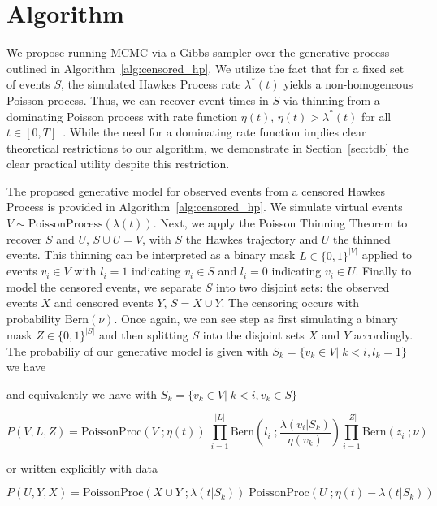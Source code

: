 \documentclass[11pt]{article}
\begin{document}
\section{Algorithm}

We propose running MCMC via a Gibbs sampler over the generative process outlined in Algorithm~\ref{alg:censored_hp}. We utilize the fact that for a fixed set of events $S$, the simulated Hawkes Process rate $\lambda^*(t)$ yields a non-homogeneous Poisson process. Thus, we can recover event times in $S$ via thinning from a dominating Poisson process with rate function $\eta(t)$, $\eta(t) > \lambda^*(t)$ for all $t \in [0,T]$~\cite{pthin}. While the need for a dominating rate function implies clear theoretical restrictions to our algorithm, we demonstrate in Section~\ref{sec:tdb} the clear practical utility despite this restriction.

The proposed generative model for observed events from a censored Hawkes Process is provided in Algorithm~\ref{alg:censored_hp}. We simulate virtual events $V\sim \text{PoissonProcess}(\lambda(t))$. Next, we apply the Poisson Thinning Theorem to recover $S$ and $U$, $S \cup U = V$, with $S$ the Hawkes trajectory and $U$ the thinned events. This thinning can be interpreted as a binary mask $L \in \{0,1\}^{|V|}$ applied to events $v_i \in V$ with $l_i = 1$ indicating $v_i \in S$ and $l_i = 0$ indicating $v_i \in U$. Finally to model the censored events, we separate $S$ into two disjoint sets: the observed events $X$ and censored events $Y$, $S = X \cup Y$. The censoring occurs with probability $\text{Bern}(\nu)$. Once again, we can see step as first simulating a binary mask $Z \in \{0,1\}^{|S|}$ and then splitting $S$ into the disjoint sets $X$ and $Y$ accordingly. The probabiliy of our generative model is given with $S_k = \{v_k \in V|\; k < i, l_k = 1\}$ we have


and equivalently we have with $S_k = \{v_k \in V |\; k < i, v_k \in S\}$



\begin{equation}
P(V,L,Z)
=
\text{PoissonProc}(V\;;\eta(t))\;
\prod_{i=1}^{|L|} \text{Bern}\left(l_i\;;\frac{\lambda(v_i | S_k)}{\eta(v_k)}\right)
\prod_{i=1}^{|Z|} \text{Bern}(z_i\;;\nu)
\end{equation}

\noindent or written explicitly with data

\[
P(U,Y,X)
=
\text{PoissonProc}(X \cup Y\;;\lambda(t|S_k))\;
\text{PoissonProc}(U\;;\eta(t) - \lambda(t|S_k))\;
\]
\end{document}
